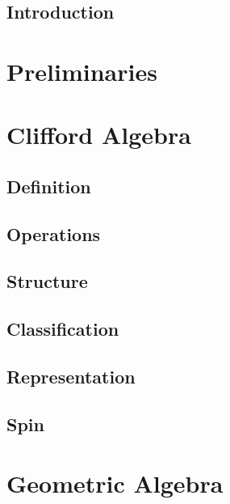 \maketitle

\subsection*{Introduction}
\label{sec:intro}



\section{Preliminaries}
\label{cha:preliminaries}



\section{Clifford Algebra}
\label{cha:ca}

\subsection{Definition}
\label{sec:def}



\subsection{Operations}
\label{sec:ops}



\subsection{Structure}

\subsection{Classification}

\subsection{Representation}

\subsection{Spin}

\section{Geometric Algebra}
\label{cha:ga}

